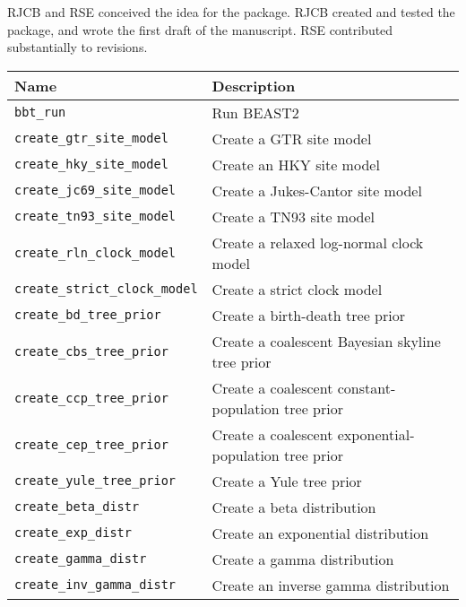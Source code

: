 \documentclass{article}
\begin{document}
RJCB and RSE conceived the idea for the package. RJCB created and tested the package, and wrote the first draft of the manuscript. RSE contributed substantially to revisions.




\begin{table}[h]
\centering
\begin{tabular}{ | l | l | }
\hline
\textbf{Name} & \textbf{Description} \\
\hline
\verb;bbt_run; & Run BEAST2 \\
\hline
\verb;create_gtr_site_model; & Create a GTR site model \\
\verb;create_hky_site_model; & Create an HKY site model \\
\verb;create_jc69_site_model; & Create a Jukes-Cantor site model \\
\verb;create_tn93_site_model; & Create a TN93 site model \\
\hline
\verb;create_rln_clock_model; & Create a relaxed log-normal clock model \\
\verb;create_strict_clock_model; & Create a strict clock model \\
\hline
\verb;create_bd_tree_prior; & Create a birth-death tree prior \\
\verb;create_cbs_tree_prior; & Create a coalescent Bayesian skyline tree prior \\
\verb;create_ccp_tree_prior; & Create a coalescent constant-population tree prior \\
\verb;create_cep_tree_prior; & Create a coalescent exponential-population tree prior \\
\verb;create_yule_tree_prior; & Create a Yule tree prior \\
\hline
\verb;create_beta_distr; & Create a beta distribution \\
\verb;create_exp_distr; & Create an exponential distribution \\
\verb;create_gamma_distr; & Create a gamma distribution \\
\verb;create_inv_gamma_distr; & Create an inverse gamma distribution \\

\end{tabular}
\end{table}
\end{document}

